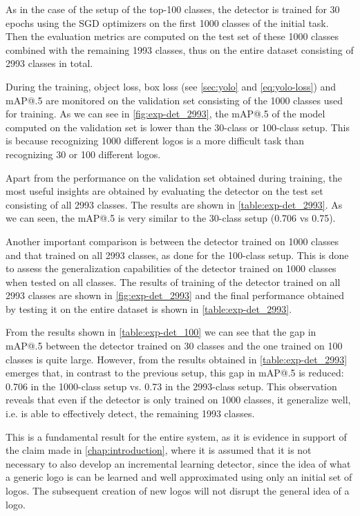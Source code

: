 As in the case of the setup of the top-100 classes, the detector is trained for 30 epochs using the SGD optimizers on the first 1000 classes of the initial task. Then the evaluation metrics are computed on the test set of these 1000 classes combined with the remaining 1993 classes, thus on the entire dataset consisting of 2993 classes in total.

During the training, object loss, box loss (see \autoref{sec:yolo} and \autoref{eq:yolo-loss}) and mAP@.5 are monitored on the validation set consisting of the 1000 classes used for training.
As we can see in \autoref{fig:exp-det_2993}, the mAP@.5 of the model computed on the validation set is lower than the 30-class or 100-class setup.
This is because recognizing 1000 different logos is a more difficult task than recognizing 30 or 100 different logos.

Apart from the performance on the validation set obtained during training, the most useful insights are obtained by evaluating the detector on the test set consisting of all 2993 classes. The results are shown in \autoref{table:exp-det_2993}. As we can seen, the mAP@.5 is very similar to the 30-class setup (0.706 vs 0.75).

Another important comparison is between the detector trained on 1000 classes and that trained on all 2993 classes, as done for the 100-class setup.
This is done to assess the generalization capabilities of the detector trained on 1000 classes when tested on all classes.
The results of training of the detector trained on all 2993 classes are shown in \autoref{fig:exp-det_2993} and the final performance obtained by testing it on the entire dataset is shown in \autoref{table:exp-det_2993}.

From the results shown in \autoref{table:exp-det_100} we can see that the gap in mAP@.5 between the detector trained on 30 classes and the one trained on 100 classes is quite large. However, from the results obtained in \autoref{table:exp-det_2993} emerges that, in contrast to the previous setup, this gap in mAP@.5 is reduced: 0.706 in the 1000-class setup vs. 0.73 in the 2993-class setup.
This observation reveals that even if the detector is only trained on 1000 classes, it generalize well, i.e. is able to effectively detect, the remaining 1993 classes.

This is a fundamental result for the entire system, as it is evidence in support of the claim made in \autoref{chap:introduction}, where it is assumed that it is not necessary to also develop an incremental learning detector, since the idea of what a generic logo is can be learned and well approximated using only an initial set of logos. The subsequent creation of new logos will not disrupt the general idea of a logo.

